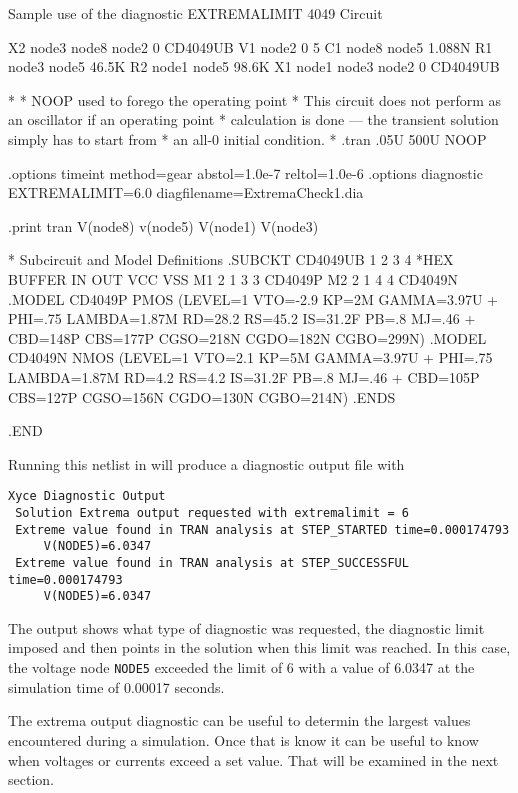 \begin{NetlistFigure}{Sample use of the diagnostic EXTREMALIMIT}
4049 Circuit

X2 node3 node8 node2 0 CD4049UB
V1 node2 0 5
C1 node8 node5 1.088N
R1 node3 node5 46.5K
R2 node1 node5 98.6K
X1 node1 node3 node2 0 CD4049UB

*
* NOOP used to forego the operating point
* This circuit does not perform as an oscillator if an operating point
* calculation is done --- the transient solution simply has to start from
* an all-0 initial condition.
*
.tran .05U 500U NOOP

.options timeint method=gear abstol=1.0e-7 reltol=1.0e-6
.options diagnostic EXTREMALIMIT=6.0 diagfilename=ExtremaCheck1.dia

.print tran V(node8) v(node5) V(node1) V(node3)

* Subcircuit and Model Definitions
.SUBCKT CD4049UB 1  2   3   4
*HEX BUFFER    IN OUT VCC VSS
M1 2 1 3 3 CD4049P
M2 2 1 4 4 CD4049N
.MODEL CD4049P PMOS (LEVEL=1 VTO=-2.9 KP=2M GAMMA=3.97U
+ PHI=.75 LAMBDA=1.87M RD=28.2 RS=45.2 IS=31.2F PB=.8 MJ=.46
+ CBD=148P CBS=177P CGSO=218N CGDO=182N CGBO=299N)
.MODEL CD4049N NMOS (LEVEL=1 VTO=2.1 KP=5M GAMMA=3.97U
+ PHI=.75 LAMBDA=1.87M RD=4.2 RS=4.2 IS=31.2F PB=.8 MJ=.46
+ CBD=105P CBS=127P CGSO=156N CGDO=130N CGBO=214N)
.ENDS

.END
\end{NetlistFigure}

Running this netlist in \Xyce{} will produce a diagnostic output file with 
\begin{verbatim}
Xyce Diagnostic Output
 Solution Extrema output requested with extremalimit = 6
 Extreme value found in TRAN analysis at STEP_STARTED time=0.000174793
     V(NODE5)=6.0347
 Extreme value found in TRAN analysis at STEP_SUCCESSFUL time=0.000174793
     V(NODE5)=6.0347
\end{verbatim}

The output shows what type of diagnostic was requested, the diagnostic limit imposed
and then points in the solution when this limit was reached.  In this case, the 
voltage node \texttt{NODE5} exceeded the limit of 6 with a value of 6.0347 at the 
simulation time of 0.00017 seconds.

The extrema output diagnostic can be useful to determin the largest values encountered
during a simulation.  Once that is know it can be useful to know when voltages or 
currents exceed a set value.  That will be examined in the next section.

